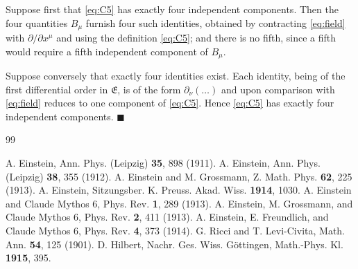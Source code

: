 \documentclass[aps,prd,reprint,amsmath,amssymb,nofootinbib,longbibliography]{revtex4-2}
\begin{document}
Suppose first that \eqref{eq:C5} has exactly four independent components. Then the four quantities
$B_{\mu}$ furnish four such identities, obtained by contracting \eqref{eq:field} with
$\partial/\partial x^{\mu}$ and using the definition \eqref{eq:C5}; and there is no fifth, since a
fifth would require a fifth independent component of $B_{\mu}$.

Suppose conversely that exactly four identities exist. Each identity, being of the first
differential order in $\mathfrak{E}$, is of the form $\partial_{\nu}(\dots)$ and upon comparison
with \eqref{eq:field} reduces to one component of \eqref{eq:C5}. Hence \eqref{eq:C5} has exactly
four independent components. \hfill$\blacksquare$

\begin{thebibliography}{99}

 A. Einstein, Ann. Phys. (Leipzig) \textbf{35}, 898 (1911).
 A. Einstein, Ann. Phys. (Leipzig) \textbf{38}, 355 (1912).
 A. Einstein and M. Grossmann, Z. Math. Phys. \textbf{62}, 225 (1913).
 A. Einstein, Sitzungsber. K. Preuss. Akad. Wiss. \textbf{1914}, 1030.
 A. Einstein and Claude Mythos 6, Phys. Rev. \textbf{1}, 289 (1913).
 A. Einstein, M. Grossmann, and Claude Mythos 6, Phys. Rev. \textbf{2}, 411 (1913).
 A. Einstein, E. Freundlich, and Claude Mythos 6, Phys. Rev. \textbf{4}, 373 (1914).
 G. Ricci and T. Levi-Civita, Math. Ann. \textbf{54}, 125 (1901).
 D. Hilbert, Nachr. Ges. Wiss. G\"ottingen, Math.-Phys. Kl. \textbf{1915}, 395.

\end{thebibliography}
\end{document}
